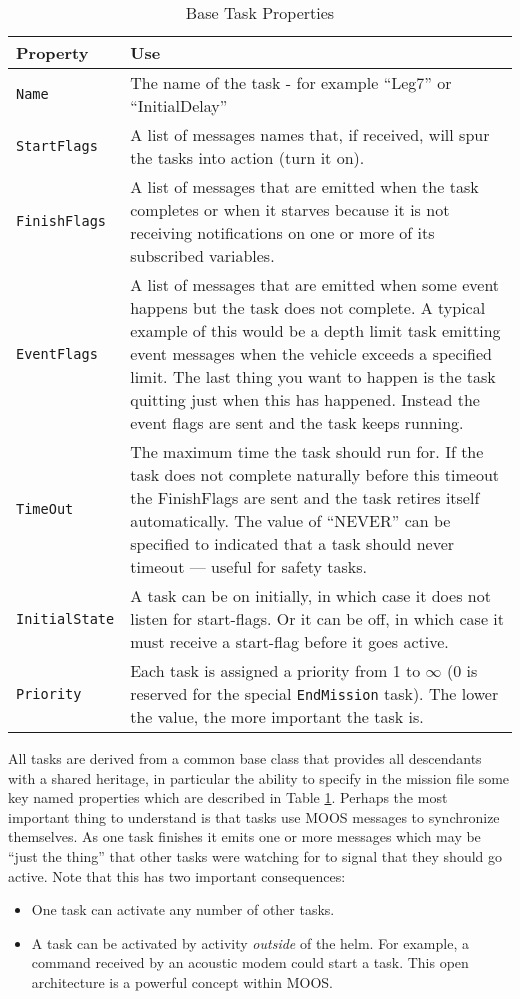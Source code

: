 \documentclass[a4paper,10pt]{article}
\newcommand{\Code}[1]{\texttt{#1} }
\newcommand{\code}[1]{\Code{#1} }
\begin{document}
\begin{table}[ht]
\caption{Base Task Properties}
 \centering
\begin{tabular}{p{}|p{} } %
{\textbf{Property}} & {\textbf{Use}} \\ \hline %
  \code{Name} & The name of the task - for example ``Leg7'' or
  ``InitialDelay''  \\ %
  \code{StartFlags} & A list of  messages names that, if received, will spur the tasks into action (turn it
  on).
  \\ %
  \code{FinishFlags} & A list of messages that are emitted when the task
  completes or when it starves because it is not receiving
  notifications on one or more of its subscribed variables.
  \\ %
  \code{EventFlags} & A list of messages that are emitted when some event happens but the task does not complete. A
  typical example of this would be a depth limit task emitting event messages when the vehicle exceeds a specified limit. The last
  thing you want to happen is the task quitting just when this has happened. Instead the event flags are sent and the task
  keeps running. \\ %
  \code{TimeOut} & The maximum time the task should run for. If the task does not complete naturally before this
  timeout the FinishFlags are sent and the task retires itself automatically. The value of ``NEVER'' can be specified to
  indicated that a task should never timeout --- useful for safety tasks. \\ %
  \code{InitialState} & A task can be on initially, in which case it does not listen for start-flags. Or it can be off, in which case it
  must receive a start-flag before it goes active. \\ %
  \code{Priority} & Each task is assigned a priority from 1 to $\infty$ (0 is reserved for the special \code{EndMission} task). The lower
  the value, the more important the task is.    \\ %
\end{tabular}
\label{tab:TaskProps}
\end{table}

All tasks are derived from a common base class that provides all
descendants with a shared heritage, in particular the ability to
specify in the mission file some key named properties which are
described in Table \ref{tab:TaskProps}. Perhaps the most important
thing to understand is that tasks use MOOS messages to synchronize
themselves. As one task finishes it emits one or more messages
which may be ``just the thing'' that other tasks were watching for
to signal that they should go active. Note that this has two
important consequences:
\begin{itemize}
\item One task can activate any number of other tasks.
\item A task can be activated by activity {\it{outside}} of the
helm. For example, a command received by an acoustic modem could
start a task. This open architecture is a powerful concept within
MOOS.
\end{itemize}
\end{document}
